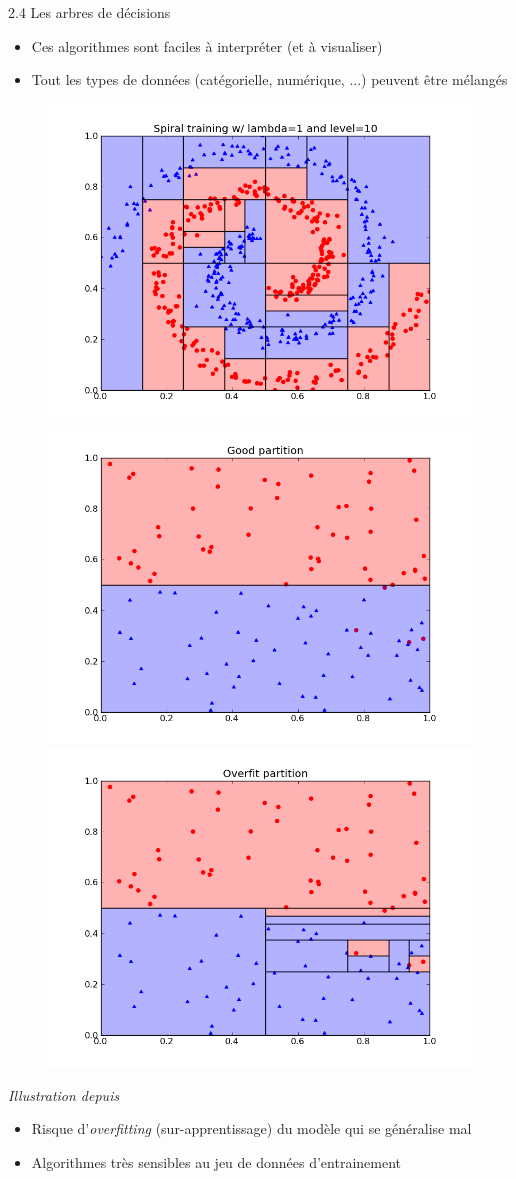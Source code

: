 \begin{frame}{2.4 Les arbres de décisions}
  \begin{itemize}
  \item Ces algorithmes sont faciles à interpréter (et à visualiser)
  \item Tout les types de données (catégorielle, numérique, ...) peuvent être mélangés
  \end{itemize}
  \begin{figure}
    \includegraphics[trim={0 0 0 40},clip,width=.3\textwidth]{figs/spiralDTresult.png}
    \includegraphics[trim={0 0 0 40},clip,width=.3\textwidth]{figs/goodPartitionDT.png}
    \includegraphics[trim={0 0 0 40},clip,width=.3\textwidth]{figs/overfittingPartitionDT.png}
  \end{figure}
  \vspace{-0.8cm}
  \begin{center}
    \scriptsize
    \textit{Illustration depuis \href{https://www.classes.cs.uchicago.edu/archive/2013/winter/12200-1/assignments/pa4/index.html}{\color{blue}{University of Chicago}}}
  \end{center}
  \begin{itemize}
  \item Risque d'\textit{overfitting} (sur-apprentissage) du modèle qui se généralise mal
  \item Algorithmes très sensibles au jeu de données d'entrainement
  \end{itemize}
\end{frame}

